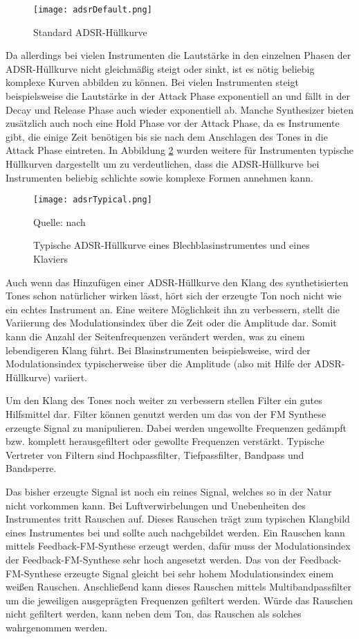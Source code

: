 \begin{figure} [ht]
\centering
  \texttt{[image: adsrDefault.png]}
\caption{Standard ADSR-Hüllkurve}
\label{fig:adsrDefault}
\end{figure}

Da allerdings bei vielen Instrumenten die Lautstärke in den einzelnen Phasen der ADSR-Hüllkurve nicht gleichmäßig steigt oder sinkt, ist es nötig beliebig komplexe Kurven abbilden zu können. Bei vielen Instrumenten steigt beispielsweise die Lautstärke in der Attack Phase exponentiell an und fällt in der Decay und Release Phase auch wieder exponentiell ab. Manche Synthesizer bieten zusätzlich auch noch eine Hold Phase vor der Attack Phase, da es Instrumente gibt, die einige Zeit benötigen bis sie nach dem Anschlagen des Tones in die Attack Phase eintreten. In Abbildung \ref{fig:adsrTypical} wurden weitere für Instrumenten typische Hüllkurven dargestellt um zu verdeutlichen, dass die ADSR-Hüllkurve bei Instrumenten beliebig schlichte sowie komplexe Formen annehmen kann.

\begin{figure} [ht]
\centering
  \texttt{[image: adsrTypical.png]}
\caption{Typische ADSR-Hüllkurve eines Blechblasinstrumentes und eines Klaviers}
\label{fig:adsrTypical}
Quelle: nach \cite{chowningPaper}
\end{figure}

Auch wenn das Hinzufügen einer ADSR-Hüllkurve den Klang des synthetisierten Tones schon natürlicher wirken lässt, hört sich der erzeugte Ton noch nicht wie ein echtes Instrument an. Eine weitere Möglichkeit ihn zu verbessern, stellt die Variierung des Modulationsindex über die Zeit oder die Amplitude dar. Somit kann die Anzahl der Seitenfrequenzen verändert werden, was zu einem lebendigeren Klang führt. Bei Blasinstrumenten beispielsweise, wird der Modulationsindex typischerweise über die Amplitude (also mit Hilfe der ADSR-Hüllkurve) variiert. \cite[S. 532]{chowningPaper}

Um den Klang des Tones noch weiter zu verbessern stellen Filter ein gutes Hilfsmittel dar. Filter können genutzt werden um das von der FM Synthese erzeugte Signal zu manipulieren. Dabei werden ungewollte Frequenzen gedämpft bzw. komplett herausgefiltert oder gewollte Frequenzen verstärkt. Typische Vertreter von Filtern sind Hochpassfilter, Tiefpassfilter, Bandpass und Bandsperre. \cite[S. 100-104]{stotz}

Das bisher erzeugte Signal ist noch ein reines Signal, welches so in der Natur nicht vorkommen kann. Bei Luftverwirbelungen und Unebenheiten des Instrumentes tritt Rauschen auf. Dieses Rauschen trägt zum typischen Klangbild eines Instrumentes bei und sollte auch nachgebildet werden. Ein Rauschen kann mittels Feedback-FM-Synthese erzeugt werden, dafür muss der Modulationsindex der Feedback-FM-Synthese sehr hoch angesetzt werden. Das von der Feedback-FM-Synthese erzeugte Signal gleicht bei sehr hohem Modulationsindex einem weißen Rauschen. Anschließend kann dieses Rauschen mittels Multibandpassfilter um die jeweiligen ausgeprägten Frequenzen gefiltert werden. Würde das Rauschen nicht gefiltert werden, kann neben dem Ton, das Rauschen als solches wahrgenommen werden. \cite[S. 152]{barkowsky}

